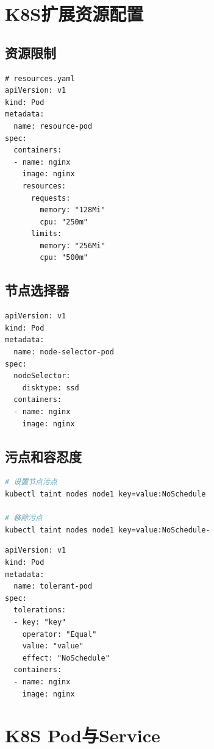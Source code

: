 \documentclass[12pt,UTF8]{ctexbook}
\begin{document}
\section{K8S扩展资源配置}
\label{sec:k8s-resources}

\subsection{资源限制}

\begin{lstlisting}
# resources.yaml
apiVersion: v1
kind: Pod
metadata:
  name: resource-pod
spec:
  containers:
  - name: nginx
    image: nginx
    resources:
      requests:
        memory: "128Mi"
        cpu: "250m"
      limits:
        memory: "256Mi"
        cpu: "500m"
\end{lstlisting}

\subsection{节点选择器}

\begin{lstlisting}
apiVersion: v1
kind: Pod
metadata:
  name: node-selector-pod
spec:
  nodeSelector:
    disktype: ssd
  containers:
  - name: nginx
    image: nginx
\end{lstlisting}

\subsection{污点和容忍度}

\begin{lstlisting}[language=bash]
# 设置节点污点
kubectl taint nodes node1 key=value:NoSchedule

# 移除污点
kubectl taint nodes node1 key=value:NoSchedule-
\end{lstlisting}

\begin{lstlisting}
apiVersion: v1
kind: Pod
metadata:
  name: tolerant-pod
spec:
  tolerations:
  - key: "key"
    operator: "Equal"
    value: "value"
    effect: "NoSchedule"
  containers:
  - name: nginx
    image: nginx
\end{lstlisting}

\section{K8S Pod与Service}
\label{sec:k8s-pod-service}
\end{document}
